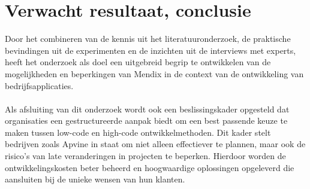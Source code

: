 \section{Verwacht resultaat, conclusie}%
\label{sec:verwachte_resultaten}

Door het combineren van de kennis uit het literatuuronderzoek, de praktische bevindingen uit de experimenten en de inzichten uit de interviews met experts, heeft het onderzoek als doel een uitgebreid begrip te ontwikkelen van de mogelijkheden en beperkingen van Mendix in de context van de ontwikkeling van bedrijfsapplicaties. 
\\
\\
Als afsluiting van dit onderzoek wordt ook een beslissingskader opgesteld dat organisaties een gestructureerde aanpak biedt om een best passende keuze te maken tussen low-code en high-code ontwikkelmethoden. Dit kader stelt bedrijven zoals Apvine in staat om niet alleen effectiever te plannen, maar ook de risico's van late veranderingen in projecten te beperken. Hierdoor worden de ontwikkelingskosten beter beheerd en hoogwaardige oplossingen opgeleverd die aansluiten bij de unieke wensen van hun klanten.



